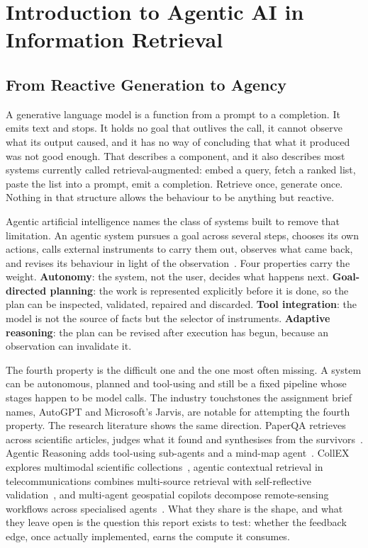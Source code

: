 \chapter{Introduction to Agentic AI in Information Retrieval}
\label{ch:introduction}

\section{From Reactive Generation to Agency}

A generative language model is a function from a prompt to a completion. It
emits text and stops. It holds no goal that outlives the call, it cannot observe
what its output caused, and it has no way of concluding that what it produced
was not good enough. That describes a component, and it also describes most
systems currently called retrieval-augmented: embed a query, fetch a ranked
list, paste the list into a prompt, emit a completion. Retrieve once, generate
once. Nothing in that structure allows the behaviour to be anything but
reactive.

Agentic artificial intelligence names the class of systems built to remove that
limitation. An agentic system pursues a goal across several steps, chooses its
own actions, calls external instruments to carry them out, observes what came
back, and revises its behaviour in light of the
observation~\cite{zhang2024aiagent,wu2025agentic}. Four properties carry the
weight. \textbf{Autonomy}: the system, not the user, decides what happens next.
\textbf{Goal-directed planning}: the work is represented explicitly before it
is done, so the plan can be inspected, validated, repaired and discarded.
\textbf{Tool integration}: the model is not the source of facts but the
selector of instruments. \textbf{Adaptive reasoning}: the plan can be revised
after execution has begun, because an observation can invalidate it.

The fourth property is the difficult one and the one most often missing. A
system can be autonomous, planned and tool-using and still be a fixed pipeline
whose stages happen to be model calls. The industry touchstones the assignment
brief names, AutoGPT and Microsoft's Jarvis, are notable for attempting the
fourth property. The research literature shows the same direction. PaperQA
retrieves across scientific articles, judges what it found and synthesises from
the survivors~\cite{lala2023paperqa}. Agentic Reasoning adds tool-using
sub-agents and a mind-map agent~\cite{wu2025agentic}. CollEX explores
multimodal scientific collections~\cite{schneider2025collex}, agentic
contextual retrieval in telecommunications combines multi-source retrieval
with self-reflective validation~\cite{zhang2025toward}, and multi-agent
geospatial copilots decompose remote-sensing workflows across specialised
agents~\cite{lee2025multiagent}. What they share is the shape, and what they
leave open is the question this report exists to test: whether the feedback
edge, once actually implemented, earns the compute it consumes.

